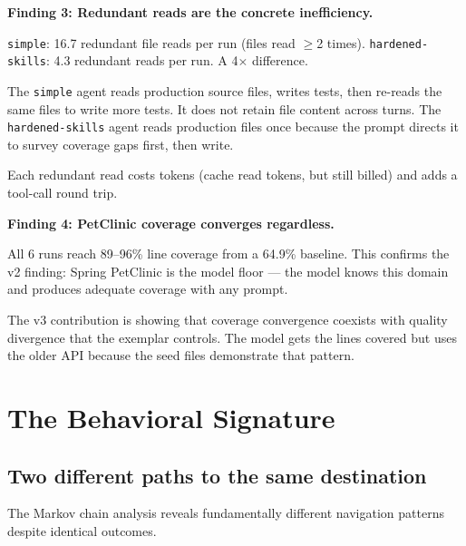 \documentclass[11pt,a4paper]{article}
\begin{document}
\begin{findingbox}
\textbf{Finding 3: Redundant reads are the concrete inefficiency.}

\texttt{simple}: 16.7 redundant file reads per run (files read $\geq$2 times).
\texttt{hardened-skills}: 4.3 redundant reads per run. A 4$\times$ difference.

The \texttt{simple} agent reads production source files, writes tests, then re-reads
the same files to write more tests. It does not retain file content across
turns. The \texttt{hardened-skills} agent reads production files once
because the prompt directs it to survey coverage gaps first, then write.

Each redundant read costs tokens (cache read tokens, but still billed)
and adds a tool-call round trip.
\end{findingbox}

\begin{findingbox}
\textbf{Finding 4: PetClinic coverage converges regardless.}

All 6 runs reach 89--96\% line coverage from a 64.9\% baseline.
This confirms the v2 finding: Spring PetClinic is the model floor ---
the model knows this domain and produces adequate coverage with any prompt.

The v3 contribution is showing that coverage convergence coexists with
quality divergence that the exemplar controls. The model gets the lines
covered but uses the older API because the seed files demonstrate that pattern.
\end{findingbox}

\section{The Behavioral Signature}
\label{sec:behavioral}

\subsection*{Two different paths to the same destination}

The Markov chain analysis reveals fundamentally different navigation patterns
despite identical outcomes.
\end{document}
